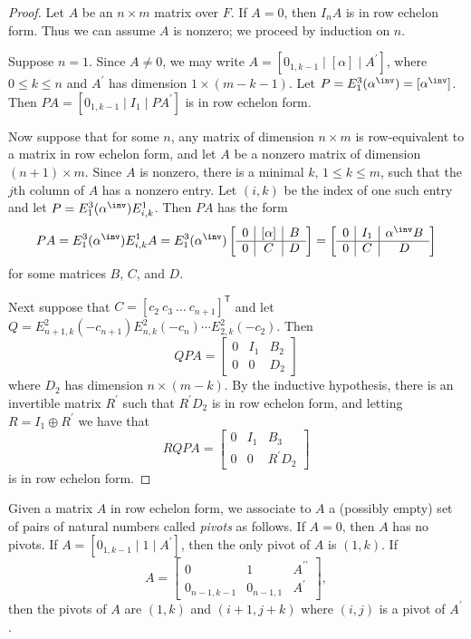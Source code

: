 \begin{proof}
Let $A$ be an $n \times m$ matrix over $F$. If $A = 0$, then $I_nA$ is in row echelon form. Thus we can assume $A$ is nonzero; we proceed by induction on $n$.

Suppose $n = 1$. Since $A \neq 0$, we may write $A = [0_{1,k-1} \mid [\alpha] \mid A^\prime]$, where $0 \leq k \leq n$ and $A^\prime$ has dimension $1 \times (m-k-1)$. Let $P = E^3_1(\alpha^\inv) = [\alpha^\inv]$. Then $PA = [0_{1,k-1} \mid I_1 \mid PA^\prime]$ is in row echelon form.

Now suppose that for some $n$, any matrix of dimension $n \times m$ is row-equivalent to a matrix in row echelon form, and let $A$ be a nonzero matrix of dimension $(n+1) \times m$. Since $A$ is nonzero, there is a minimal $k$, $1 \leq k \leq m$, such that the $j$th column of $A$ has a nonzero entry. Let $(i,k)$ be the index of one such entry and let $P = E^3_1(\alpha^\inv)E^1_{i,k}$. Then $PA$ has the form \[PA = E^3_1(\alpha^\inv)E^1_{i,k}A = E^3_1(\alpha^\inv)\left[\begin{array}{c|c|c} 0 & [\alpha] & B \\ \hline 0 & C & D \end{array}\right] = \left[\begin{array}{c|c|c} 0 & I_1 & \alpha^\inv B \\ \hline 0 & C & D \end{array}\right]\] for some matrices $B$, $C$, and $D$.

Next suppose that $C = [c_2\ c_3\ \ldots\ c_{n+1}]^\mathsf{T}$ and let $Q = E^2_{n+1,k}(-c_{n+1}) E^2_{n,k}(-c_n) \cdots E^2_{2,k}(-c_2)$. Then \[ QPA = \left[\begin{array}{c|c|c} 0 & I_1 & B_2 \\ \hline 0 & 0 & D_2 \end{array}\right] \] where $D_2$ has dimension $n \times (m-k)$. By the inductive hypothesis, there is an invertible matrix $R^\prime$ such that $R^\prime D_2$ is in row echelon form, and letting $R = I_1 \oplus R^\prime$ we have that \[RQPA = \left[\begin{array}{c|c|c} 0 & I_1 & B_3 \\ \hline 0 & 0 & R^\prime D_2 \end{array}\right]\] is in row echelon form.
\end{proof}

\begin{dfn}[Pivot]
Given a matrix $A$ in row echelon form, we associate to $A$ a (possibly empty) set of pairs of natural numbers called \emph{pivots} as follows. If $A = 0$, then $A$ has no pivots. If $A = [0_{1,k-1} \mid 1 \mid A^\prime]$, then the only pivot of $A$ is $(1,k)$. If \[A = \left[\begin{array}{c|c|c} 0 & 1 & A^{\prime\prime} \\ \hline 0_{n-1,k-1} & 0_{n-1,1} & A^\prime \end{array}\right], \] then the pivots of $A$ are $(1,k)$ and $(i+1,j+k)$ where $(i,j)$ is a pivot of $A^\prime$.
\end{dfn}

